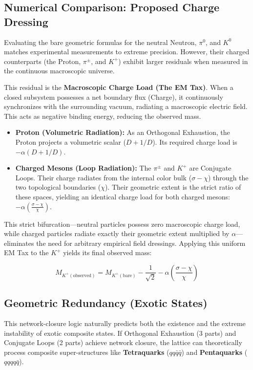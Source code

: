 \subsection{Numerical Comparison: Proposed Charge Dressing}

Evaluating the bare geometric formulas for the neutral Neutron, $\pi^0$, and $K^0$ matches experimental measurements to extreme precision. However, their charged counterparts (the Proton, $\pi^\pm$, and $K^+$) exhibit larger residuals when measured in the continuous macroscopic universe. 

This residual is the \textbf{Macroscopic Charge Load (The EM Tax)}. When a closed subsystem possesses a net boundary flux (Charge), it continuously synchronizes with the surrounding vacuum, radiating a macroscopic electric field. This acts as negative binding energy, reducing the observed mass.

\begin{itemize}
    \item \textbf{Proton (Volumetric Radiation):} As an Orthogonal Exhaustion, the Proton projects a volumetric scalar ($D + 1/D$). Its required charge load is $-\alpha(D + 1/D)$. 
    
    \item \textbf{Charged Mesons (Loop Radiation):} The $\pi^\pm$ and $K^+$ are Conjugate Loops. Their charge radiates from the internal color bulk ($\sigma - \chi$) through the two topological boundaries ($\chi$). Their geometric extent is the strict ratio of these spaces, yielding an identical charge load for both charged mesons: $-\alpha(\frac{\sigma - \chi}{\chi})$. 
\end{itemize}

This strict bifurcation—neutral particles possess zero macroscopic charge load, while charged particles radiate exactly their geometric extent multiplied by $\alpha$—eliminates the need for arbitrary empirical field dressings. Applying this uniform EM Tax to the $K^+$ yields its final observed mass:

\begin{equation}
    M_{K^+ (\text{observed})} = M_{K^+ (\text{bare})} - \frac{1}{\sqrt{2}} - \alpha\left(\frac{\sigma - \chi}{\chi}\right)
\end{equation}



\subsection{Geometric Redundancy (Exotic States)}
This network-closure logic naturally predicts both the existence and the extreme instability of exotic composite states. If Orthogonal Exhaustion (3 parts) and Conjugate Loops (2 parts) achieve network closure, the lattice can theoretically process composite super-structures like \textbf{Tetraquarks} ($qq\bar{q}\bar{q}$) and \textbf{Pentaquarks} ($qqqq\bar{q}$). 

